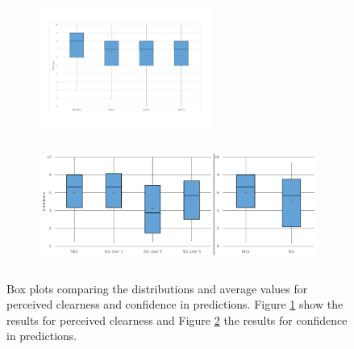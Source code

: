 \documentclass[letterpaper, 10 pt, conference]{ieeeconf}
\begin{document}
\begin{figure}[t]
  \begin{subfigure}[b]{0.5\textwidth}
    \centering
    \includegraphics[width=\linewidth, height=4cm]{images/multi-user-legibility-study-clearness-graph}
    \caption{}
    \label{fig:results-clearness}
  \end{subfigure}
  \hfill %
  \begin{subfigure}[b]{0.5\textwidth}
    \centering
    \includegraphics[width=\linewidth, height=4cm]{images/multi-user-legibility-study-confidence-graph}
    \caption{}
    \label{fig:results-confidence}
  \end{subfigure}
  \caption{Box plots comparing the distributions and average values for perceived clearness and confidence in predictions. Figure \ref{fig:results-clearness} show the results for perceived clearness and Figure \ref{fig:results-confidence} the results for confidence in predictions.}
  \label{fig:results-clearness-confidence}
\end{figure}
\end{document}
